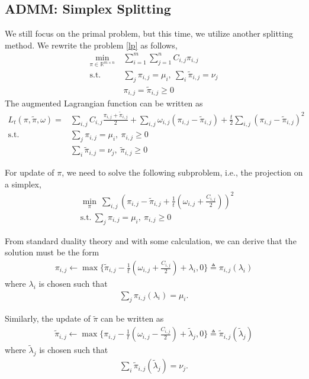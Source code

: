 \documentclass[english]{pkupaper}
\newenvironment{eqt}{\begin{equation}\begin{aligned}}{\end{aligned}\end{equation}}
\begin{document}
\subsection{ADMM: Simplex Splitting}
\label{sec:2.2}
We still focus on the primal problem, but this time, we utilize another splitting method. We rewrite the problem \ref{lp} as follows,
\begin{eqt}
\min_{\pi\in\mathbb{R}^{m\times n}}&\ \sum_{i=1}^m\sum_{j=1}^nC_{i, j}\pi_{i, j} \\
\text{s.t.}&\ \sum_{j}\pi_{i, j} = \mu_i,\ \sum_{i}\tilde{\pi}_{i, j} = \nu_j \\
&\ \pi_{i, j} = \tilde{\pi}_{i, j}\geqslant 0
\end{eqt}
The augmented Lagrangian function can be written as
\begin{eqt}
L_t(\pi, \tilde{\pi}, \omega) = & \sum_{i, j}C_{i, j}\frac{\pi_{i, j} + \tilde{\pi}_{i, j}}{2} + \sum_{i, j}\omega_{i, j}(\pi_{i, j} - \tilde{\pi}_{i, j}) + \frac{t}{2}\sum_{i, j}(\pi_{i, j}-\tilde{\pi}_{i, j})^2 \\
\text{s.t.}\ & \sum_{j}\pi_{i, j} = \mu_i,\ \pi_{i, j} \geqslant 0 \\
& \sum_{i}\tilde{\pi}_{i, j} = \nu_j,\ \tilde{\pi}_{i, j}\geqslant 0
\end{eqt} 

For update of $\pi$, we need to solve the following subproblem, i.e., the projection on a simplex,
\begin{eqt}
&\min_{\pi}\ \sum_{i, j}\left(\pi_{i, j} - \tilde{\pi}_{i, j}+\frac{1}{t}\left(\omega_{i, j} + \frac{C_{i, j}}{2}\right)\right)^2 \\
&\text{s.t.}\ \sum_{j}\pi_{i, j} = \mu_i, \ \pi_{i, j} \geqslant 0 \label{projpro}
\end{eqt}

From standard duality theory and with some calculation, we can derive that the solution must be the form 
\begin{eqt}
\pi_{i, j}\gets \max\{\tilde{\pi}_{i, j}-\frac{1}{t}\left(\omega_{i, j}+\frac{C_{i, j}}{2}\right)+\lambda_i, 0\} \triangleq \pi_{i, j}(\lambda_i) \label{projup}
\end{eqt}
where $\lambda_i$ is chosen such that 
\begin{eqt}
\sum_{j}\pi_{i, j}(\lambda_i) = \mu_i. \label{cst1}
\end{eqt}

Similarly, the update of $\tilde{\pi}$ can be written as
\begin{eqt}
\tilde{\pi}_{i, j} \gets \max\{\pi_{i, j}-\frac{1}{t}\left(\omega_{i, j}-\frac{C_{i, j}}{2}\right)+\tilde\lambda_j, 0\} \triangleq \tilde{\pi}_{i, j}(\tilde\lambda_j) \label{projup2}
\end{eqt}
where $\tilde\lambda_j$ is chosen such that 
\begin{eqt}
\sum_{i}\tilde\pi_{i, j}(\tilde\lambda_j) = \nu_j. \label{cst2}
\end{eqt}
\end{document}
